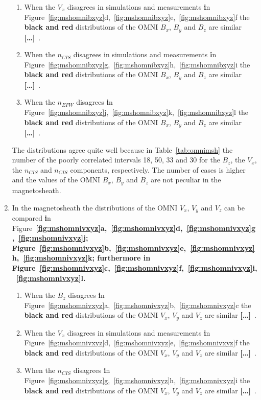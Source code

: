 \documentclass[linenumbers,draft]{agujournal}
\newcommand{\del}{\textbf{[\dots]}\ } %
\begin{document}
\begin{enumerate}
\begin{enumerate}
\item When the $V_{x}$ disagrees in simulations and measurements \textbf{i}n Figure~\ref{fig:mshomnibxyz}d,~\ref{fig:mshomnibxyz}e,~\ref{fig:mshomnibxyz}f the \textbf{black and red} distributions of the OMNI $B_{x}$, $B_{y}$ and $B_{z}$ are similar \del . 
  
\item When the $n_{CIS}$ disagrees in simulations and measurements \textbf{i}n Figure~\ref{fig:mshomnibxyz}g,~\ref{fig:mshomnibxyz}h,~\ref{fig:mshomnibxyz}i the \textbf{black and red} distributions of the OMNI $B_{x}$, $B_{y}$ and $B_{z}$ are similar \del.

\item When the $n_{EFW}$ disagrees \textbf{i}n Figure~\ref{fig:mshomnibxyz}j,~\ref{fig:mshomnibxyz}k,~\ref{fig:mshomnibxyz}l the \textbf{black and red} distributions of the OMNI $B_{x}$, $B_{y}$ and $B_{z}$ are similar \del.
\end{enumerate}
The distributions agree quite well because in Table~\ref{tab:omnimsh} the number of the poorly correlated intervals 18, 50, 33 and 30 for the $B_{z}$, the $V_{x}$, the $n_{CIS}$ and $n_{CIS}$ components, respectively. The number of cases is higher and the values of the OMNI $B_{x}$, $B_{y}$ and $B_{z}$ are not peculiar in the magnetosheath.

\item In the magnetosheath the distributions of the OMNI $V_{x}$, $V_{y}$ and $V_{z}$ can be compared \textbf{i}n Figure~\textbf{\ref{fig:mshomnivxyz}a,~\ref{fig:mshomnivxyz}d,~\ref{fig:mshomnivxyz}g,~\ref{fig:mshomnivxyz}j; Figure~\ref{fig:mshomnivxyz}b,~\ref{fig:mshomnivxyz}e,~\ref{fig:mshomnivxyz}h,~\ref{fig:mshomnivxyz}k; furthermore \textbf{i}n Figure~\ref{fig:mshomnivxyz}c,~\ref{fig:mshomnivxyz}f,~\ref{fig:mshomnivxyz}i,~\ref{fig:mshomnivxyz}l.}
\begin{enumerate}
\item When the $B_{z}$ disagrees \textbf{i}n Figure~\ref{fig:mshomnivxyz}a,~\ref{fig:mshomnivxyz}b,~\ref{fig:mshomnivxyz}c the \textbf{black and red }distributions of the OMNI $V_{x}$, $V_{y}$ and $V_{z}$ are similar \del .

\item When the $V_{x}$ disagrees in simulations and measurements \textbf{i}n Figure~\ref{fig:mshomnivxyz}d,~\ref{fig:mshomnivxyz}e,~\ref{fig:mshomnivxyz}f the \textbf{black and red} distributions of the OMNI $V_{x}$, $V_{y}$ and $V_{z}$ are similar \del .

\item When the $n_{CIS}$ disagrees \textbf{i}n Figure~\ref{fig:mshomnivxyz}g,~\ref{fig:mshomnivxyz}h,~\ref{fig:mshomnivxyz}i the \textbf{black and red} distributions of the OMNI $V_{x}$, $V_{y}$ and $V_{z}$ are similar \del.


\end{enumerate}
\end{enumerate}
\end{document}
